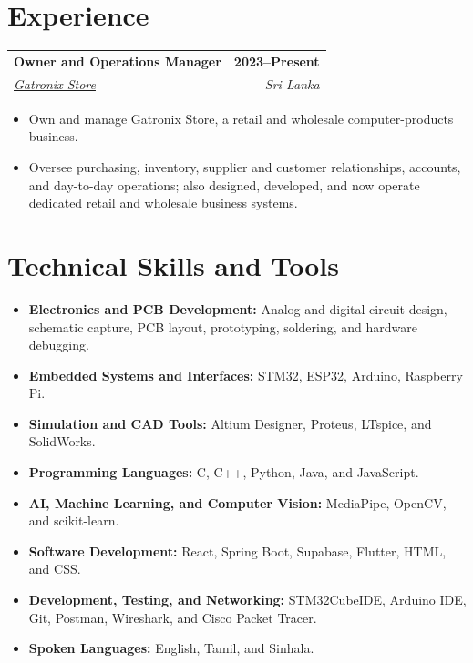 \documentclass[a4paper,10pt]{article}
\makeatletter
\newcommand{\educationEntry}[4]{%
  \begin{tabularx}{\textwidth}{@{}Xr@{}}
    \textbf{#1} & \textbf{\small #2} \\
    \textit{#3} & \textit{\small #4}
  \end{tabularx}
}
\makeatother
\begin{document}
\vspace{1.1mm}

\section{Experience}

\educationEntry
  {Owner and Operations Manager}
  {2023--Present}
  {\href{https://maps.app.goo.gl/z9wBnqUMZs5da7UM9}{Gatronix Store \faMapMarker}}
  {Sri Lanka}

\begin{itemize}
  \item Own and manage Gatronix Store, a retail and wholesale computer-products business.
  \item Oversee purchasing, inventory, supplier and customer relationships, accounts, and day-to-day operations; also designed, developed, and now operate dedicated retail and wholesale business systems.
\end{itemize}

\section{Technical Skills and Tools}
\begin{itemize}[itemsep=0.8mm,topsep=0.45mm]
  \item \textbf{Electronics and PCB Development:} Analog and digital circuit design, schematic capture, PCB layout, prototyping, soldering, and hardware debugging.
  \item \textbf{Embedded Systems and Interfaces:} STM32, ESP32, Arduino, Raspberry Pi.
  \item \textbf{Simulation and CAD Tools:} Altium Designer,  Proteus, LTspice, and SolidWorks.
  \item \textbf{Programming Languages:} C, C++, Python, Java, and JavaScript.
  \item \textbf{AI, Machine Learning, and Computer Vision:} MediaPipe, OpenCV, and scikit-learn.
  \item \textbf{Software Development:} React, Spring Boot, Supabase, Flutter, HTML, and CSS.
  \item \textbf{Development, Testing, and Networking:} STM32CubeIDE, Arduino IDE, Git, Postman, Wireshark, and Cisco Packet Tracer.
  \item \textbf{Spoken Languages:} English, Tamil, and Sinhala.
\end{itemize}
\end{document}
